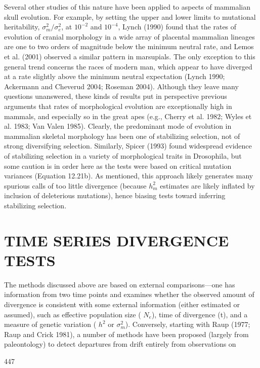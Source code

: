 \documentclass{article}
\begin{document}
Several other studies of this nature have been applied to aspects of mammalian skull evolution. For example, by setting the upper and lower limits to mutational heritability,  $ \sigma_{m}^{2}/\sigma_{e}^{2} $, at  $ 10^{-2} $ and  $ 10^{-4} $, Lynch (1990) found that the rates of evolution of cranial morphology in a wide array of placental mammalian lineages are one to two orders of magnitude below the minimum neutral rate, and Lemos et al. (2001) observed a similar pattern in marsupials. The only exception to this general trend concerns the races of modern man, which appear to have diverged at a rate slightly above the minimum neutral expectation (Lynch 1990; Ackermann and Cheverud 2004; Roseman 2004). Although they leave many questions unanswered, these kinds of results put in perspective previous arguments that rates of morphological evolution are exceptionally high in mammals, and especially so in the great apes (e.g., Cherry et al. 1982; Wyles et al. 1983; Van Valen 1985). Clearly, the predominant mode of evolution in mammalian skeletal morphology has been one of stabilizing selection, not of strong diversifying selection. Similarly, Spicer (1993) found widespread evidence of stabilizing selection in a variety of morphological traits in Drosophila, but some caution is in order here as the tests were based on critical mutation variances (Equation 12.21b). As mentioned, this approach likely generates many spurious calls of too little divergence (because  $ h_{m}^{2} $ estimates are likely inflated by inclusion of deleterious mutations), hence biasing tests toward inferring stabilizing selection.

\section{TIME SERIES DIVERGENCE TESTS}
The methods discussed above are based on external comparisons—one has information from two time points and examines whether the observed amount of divergence is consistent with some external information (either estimated or assumed), such as effective population size ( $ N_e $), time of divergence (t), and a measure of genetic variation ( $ h^2 $ or  $ \sigma_m^2 $). Conversely, starting with Raup (1977; Raup and Crick 1981), a number of methods have been proposed (largely from paleontology) to detect departures from drift entirely from observations on

447
\end{document}
